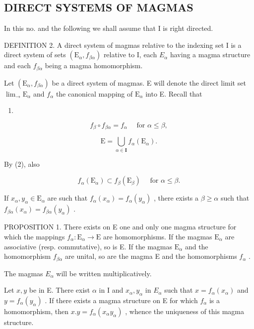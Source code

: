 \subsection{DIRECT SYSTEMS OF MAGMAS}

In this no. and the following we shall assume that I is right directed.

DEFINITION 2. A direct system of magmas relative to the indexing set I is a direct system of sets \((\mathrm{E}_{\alpha}, f_{\beta\alpha})\) relative to I, each \(E_{\alpha}\) having a magma structure and each \(f_{\beta\alpha}\) being a magma homomorphism.

Let \((\mathrm{E}_{\alpha}, f_{\beta\alpha})\) be a direct system of magmas. E will denote the direct limit set \(\lim_{\rightarrow} \mathrm{E}_{\alpha}\) and \(f_{\alpha}\) the canonical mapping of \(\mathrm{E}_{\alpha}\) into E. Recall that

\begin{enumerate}
\def\labelenumi{(\arabic{enumi})}
\setcounter{enumi}{1}
\tightlist
\item
\end{enumerate}

\[
f _ {\beta} \circ f _ {\beta \alpha} = f _ {\alpha} \quad \text { for } \alpha \leqslant \beta ,\tag{3}
\]

\[
\mathrm{E} = \bigcup_ {\alpha \in \mathbf {I}} f _ {\alpha} (\mathrm{E} _ {\alpha}).
\]

By (2), also

\[
f _ {\alpha} (\mathrm{E} _ {\alpha}) \subset f _ {\beta} (\mathrm{E} _ {\beta}) \quad \text { for } \alpha \leqslant \beta .\tag{4}
\]

If \(x_{\alpha}, y_{\alpha} \in \mathrm{E}_{\alpha}\) are such that \(f_{\alpha}(x_{\alpha}) = f_{\alpha}(y_{\alpha})\) , there exists a \(\beta \geqslant \alpha\) such that \(f_{\beta \alpha}(x_{\alpha}) = f_{\beta \alpha}(y_{\alpha})\) .

PROPOSITION 1. There exists on E one and only one magma structure for which the mappings \(f_{\alpha} \colon \mathrm{E}_{\alpha} \to \mathrm{E}\) are homomorphisms. If the magmas \(\mathrm{E}_{\alpha}\) are associative (resp. commutative), so is E. If the magmas \(\mathrm{E}_{\alpha}\) and the homomorphism \(f_{\beta \alpha}\) are unital, so are the magma E and the homomorphisms \(f_{\alpha}\) .

The magmas \(E_{\alpha}\) will be written multiplicatively.

Let \(x, y\) be in E. There exist \(\alpha\) in I and \(x_{\alpha}, y_{\alpha}\) in \(E_{\alpha}\) such that \(x = f_{\alpha}(x_{\alpha})\) and \(y = f_{\alpha}(y_{\alpha})\) . If there exists a magma structure on E for which \(f_{\alpha}\) is a homomorphism, then \(x.y = f_{\alpha}(x_{\alpha}y_{\alpha})\) , whence the uniqueness of this magma structure.

